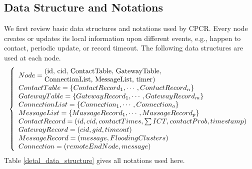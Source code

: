 \documentclass[conference]{IEEEtran}
\makeatletter
\newcommand{\tabincell}[2]{\begin{tabular}{@{}#1@{}}#2\end{tabular}}
\makeatother
\begin{document}
\subsection{Data Structure and Notations}
We first review basic data structures and notations used by CPCR.  Every node creates or updates its local information upon different events, e.g., happen to contact, periodic update, or record timeout. The following data structures are used at each node.
 \begin{align*}
        \left\{
        \begin{array}{l}
            Node = \tabincell{l}{(id, cid, ContactTable, GatewayTable,\\ConnectionList, MessageList, timer)}\\
            ContactTable = \{ContactRecord_1,\cdots, ContactRecord_n\}\\
            GatewayTable = \{GatewayRecord_1,\cdots, GatewayRecord_m\} \\
            ConnectionList=\{Connection_1,\cdots, Connection_o\}\\
            MessageList = \{MassageRecord_1, \cdots,MassageRecord_p\}\\
            ContactRecord = (id, cid, contactTimes, \sum ICT, contactProb, timestamp)\\
            GatewayRecord = (cid, gid, timeout)\\
            MessageRecord = (message, FloodingClusters)\\
            Connection = (remoteEndNode, message)\\
        \end{array}
        \right.
    \end{align*}
Table \ref{detal_data_structure} gives all notations used here.
\end{document}
